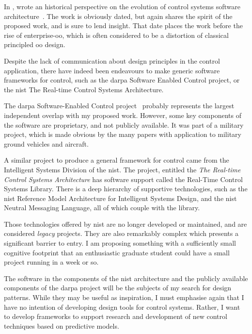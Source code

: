 In , \citeauthor{Boasson1993} wrote an historical perspective on the
evolution of control systems software architecture~\cite{Boasson1993}. The work
is obviously dated, but again shares the spirit of the proposed work, and is
sure to lend insight. That date places the work before the rise of
enterprise-\ac{oo}, which is often considered to be a distortion of classical
principled \ac{oo} design.

Despite the lack of communication about design principles in the control
application, there have indeed been endeavours to make generic software
frameworks for control, such as the \ac{darpa} Software Enabled Control
project, or the \ac{nist}
The Real-time Control Systems Architecture.

The \ac{darpa} Software-Enabled Control project~\cite{Keviczky2004,Gill2003}
probably represents the largest independent overlap with my proposed work.
However, some key components of the software are proprietary, and not publicly
available. It was part of a military project, which is made obvious by the many
papers with application to military ground vehicles and aircraft.

A similar project to produce a general framework for control came from the
Intelligent Systems Division of the \ac{nist}. The project, entitled
the \emph{The Real-time Control Systems Architecture} has software support
called the Real-Time Control Systems Library. There is a deep hierarchy of
supportive technologies, such as the \ac{nist} Reference Model Architecture for
Intelligent Systems Design, and the \ac{nist} Neutral Messaging Language, all of
which couple with the library.

Those technologies offered by \ac{nist} are no longer developed or maintained,
and are considered \emph{legacy} projects. They are also remarkably complex
which presents a significant barrier to entry. I am proposing something with a
sufficiently small cognitive footprint that an enthusiastic graduate student
could have a small project running in a week or so.

The software in the components of the \ac{nist} architecture and the publicly
available components of the \ac{darpa} project will be the subjects of my search
for design patterns. While they may be useful as inspiration, I must emphasise
again that I have no intention of developing design tools for control systems.
Rather, I want to develop frameworks to support research and development of new
control techniques based on predictive models.

